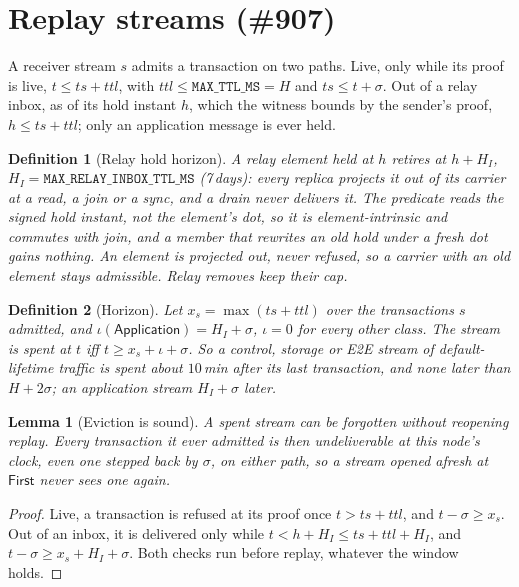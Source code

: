 \documentclass[journal]{IEEEtran}
\newtheorem{definition}{Definition}
\newtheorem{lemma}{Lemma}
\newcommand{\issue}[1]{\#{#1}}
\begin{document}
\section{Replay streams (\issue{907})}\label{sec:replay}

A receiver stream $s$ admits a transaction on two paths.  Live, only while its proof is live,
$t\le ts+ttl$, with $ttl\le\mathtt{MAX\_TTL\_MS}=H$ and $ts\le t+\sigma$.  Out of a relay inbox,
as of its hold instant $h$, which the witness bounds by the sender's proof, $h\le ts+ttl$; only
an application message is ever held.

\begin{definition}[Relay hold horizon]\label{def:relayhorizon}
A relay element held at $h$ retires at $h+H_I$, $H_I=\mathtt{MAX\_RELAY\_INBOX\_TTL\_MS}$
(7\,days): every replica projects it out of its carrier at a read, a join or a sync, and a drain
never delivers it.  The predicate reads the signed hold instant, not the element's dot, so it is
element-intrinsic and commutes with join, and a member that rewrites an old hold under a fresh
dot gains nothing.  An element is projected out, never refused, so a carrier with an old
element stays admissible.  Relay removes keep their cap.
\end{definition}

\begin{definition}[Horizon]\label{def:streamhorizon}
Let $x_s=\max(ts+ttl)$ over the transactions $s$ admitted, and
$\iota(\mathsf{Application})=H_I+\sigma$, $\iota=0$ for every other class.  The stream is
\emph{spent} at $t$ iff $t\ge x_s+\iota+\sigma$.  So a control, storage or E2E stream of
default-lifetime traffic is spent about $10$\,min after its last transaction, and none later
than $H+2\sigma$; an application stream $H_I+\sigma$ later.
\end{definition}

\begin{lemma}[Eviction is sound]\label{lem:evict}
A spent stream can be forgotten without reopening replay.  Every transaction it ever admitted is
then undeliverable at this node's clock, even one stepped back by $\sigma$, on either path, so a
stream opened afresh at $\mathsf{First}$ never sees one again.
\end{lemma}
\begin{proof}
Live, a transaction is refused at its proof once $t>ts+ttl$, and $t-\sigma\ge x_s$.  Out of an
inbox, it is delivered only while $t<h+H_I\le ts+ttl+H_I$, and $t-\sigma\ge x_s+H_I+\sigma$.
Both checks run before replay, whatever the window holds.
\end{proof}
\end{document}
